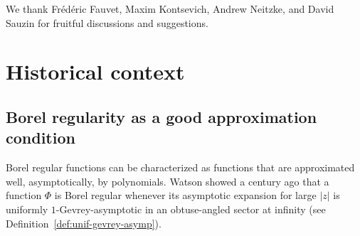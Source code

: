 \documentclass{article}
\theoremstyle{definition}
\theoremstyle{plain}
\begin{document}
We thank Fr\'{e}d\'{e}ric Fauvet, Maxim Kontsevich, Andrew Neitzke, and David Sauzin for fruitful discussions and suggestions.
%
\section{Historical context}\label{sec:historical-context}
%
\subsection{Borel regularity as a good approximation condition}
Borel regular functions can be characterized as functions that are approximated well, asymptotically, by polynomials. Watson showed a century ago \cite[Part II, Section 9]{watson2} that a function $\Phi$ is Borel regular whenever its asymptotic expansion for large $|z|$ is uniformly $1$-Gevrey-asymptotic in an obtuse-angled sector at infinity (see Definition~\ref{def:unif-gevrey-asymp}).
\end{document}
